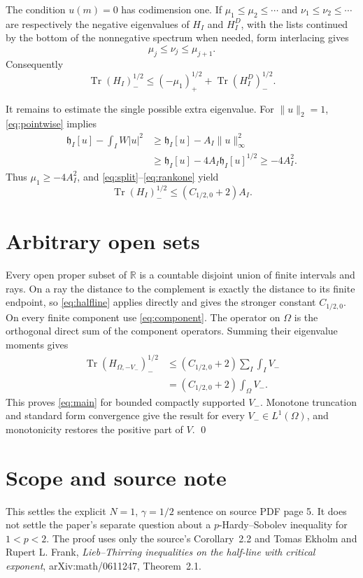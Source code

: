 \documentclass[11pt]{article}
\newcommand{\R}{\mathbb R}
\newcommand{\Tr}{\operatorname{Tr}}
\begin{document}
The condition $u(m)=0$ has codimension one.  If
$\mu_1\le\mu_2\le\cdots$ and $\nu_1\le\nu_2\le\cdots$ are respectively
the negative eigenvalues of $H_I$ and $H_I^D$, with the lists continued by
the bottom of the nonnegative spectrum when needed, form interlacing gives
\begin{equation}\label{eq:interlace}
 \mu_j\le\nu_j\le\mu_{j+1}.
\end{equation}
Consequently
\begin{equation}\label{eq:rankone}
 \Tr(H_I)_-^{1/2}
 \le(-\mu_1)_+^{1/2}+\Tr(H_I^D)_-^{1/2}.
\end{equation}

It remains to estimate the single possible extra eigenvalue.  For
$\|u\|_2=1$, \eqref{eq:pointwise} implies
\begin{align*}
 \mathfrak h_I[u]-\int_IW|u|^2
 &\ge \mathfrak h_I[u]-A_I\|u\|_\infty^2\\
 &\ge \mathfrak h_I[u]-4A_I\mathfrak h_I[u]^{1/2}
 \ge-4A_I^2.
\end{align*}
Thus $\mu_1\ge-4A_I^2$, and \eqref{eq:split}--\eqref{eq:rankone} yield
\begin{equation}\label{eq:component}
 \Tr(H_I)_-^{1/2}\le(C_{1/2,0}+2)A_I.
\end{equation}

\section{Arbitrary open sets}

Every open proper subset of $\R$ is a countable disjoint union of finite
intervals and rays.  On a ray the distance to the complement is exactly the
distance to its finite endpoint, so \eqref{eq:halfline} applies directly and
gives the stronger constant $C_{1/2,0}$.  On every finite component use
\eqref{eq:component}.  The operator on $\Omega$ is the orthogonal direct sum
of the component operators.  Summing their eigenvalue moments gives
\begin{align*}
 \Tr(H_{\Omega,-V_-})_-^{1/2}
 &\le(C_{1/2,0}+2)\sum_I\int_I V_-\\
 &=(C_{1/2,0}+2)\int_\Omega V_-.
\end{align*}
This proves \eqref{eq:main} for bounded compactly supported $V_-$.  Monotone
truncation and standard form convergence give the result for every
$V_-\in L^1(\Omega)$, and monotonicity restores the positive part of $V$.
\qed

\section*{Scope and source note}

This settles the explicit $N=1$, $\gamma=1/2$ sentence on source PDF page 5.
It does not settle the paper's separate question about a $p$-Hardy--Sobolev
inequality for $1<p<2$.  The proof uses only the source's Corollary~2.2 and
Tomas Ekholm and Rupert L. Frank, \emph{Lieb--Thirring inequalities on the
half-line with critical exponent}, arXiv:math/0611247, Theorem~2.1.
\end{document}

